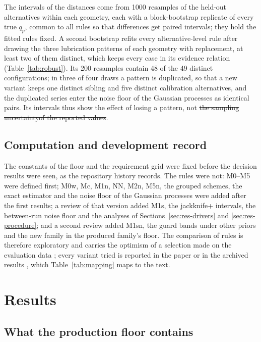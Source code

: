 \documentclass[pdflatex,sn-basic,lineno]{sn-jnl}
\providecommand{\DIFadd}[1]{{\protect\color{blue}\uwave{#1}}} %
\providecommand{\DIFdel}[1]{{\protect\color{red}\sout{#1}}}                      %
\providecommand{\DIFaddbegin}{} %
\providecommand{\DIFaddend}{} %
\providecommand{\DIFdelbegin}{} %
\providecommand{\DIFdelend}{} %
\newcommand{\DIFscaledelfig}{0.5}
\newlength{\DIFdelgraphicswidth} %
\newlength{\DIFdelgraphicsheight} %
\newcommand{\DIFaddincludegraphics}[2][]{{\color{blue}\fbox{\DIFOincludegraphics[#1]{#2}}}} %
\newcommand{\DIFdelincludegraphics}[2][]{%
\sbox{\DIFdelgraphicsbox}{\DIFOincludegraphics[#1]{#2}}%
\settoboxwidth{\DIFdelgraphicswidth}{\DIFdelgraphicsbox} %
\settoboxtotalheight{\DIFdelgraphicsheight}{\DIFdelgraphicsbox} %
\scalebox{\DIFscaledelfig}{%
\parbox[b]{\DIFdelgraphicswidth}{\usebox{\DIFdelgraphicsbox}\\[-\baselineskip] \rule{\DIFdelgraphicswidth}{0em}}\llap{\resizebox{\DIFdelgraphicswidth}{\DIFdelgraphicsheight}{%
\setlength{\unitlength}{\DIFdelgraphicswidth}%
\begin{picture}(1,1)%
\thicklines\linethickness{2pt} %
{\color[rgb]{1,0,0}\put(0,0){\framebox(1,1){}}}%
{\color[rgb]{1,0,0}\put(0,0){\line( 1,1){1}}}%
{\color[rgb]{1,0,0}\put(0,1){\line(1,-1){1}}}%
\end{picture}%
}\hspace*{3pt}}} %
} %
\DeclareRobustCommand{\DIFaddbegin}{\DIFOaddbegin \let\includegraphics\DIFaddincludegraphics} %
\DeclareRobustCommand{\DIFaddend}{\DIFOaddend \let\includegraphics\DIFOincludegraphics} %
\DeclareRobustCommand{\DIFdelbegin}{\DIFOdelbegin \let\includegraphics\DIFdelincludegraphics} %
\DeclareRobustCommand{\DIFdelend}{\DIFOaddend \let\includegraphics\DIFOincludegraphics} %
\begin{document}
The intervals of the distances come from 1000 resamples of the held-out alternatives within each geometry, each with a block-bootstrap replicate of every true $q_p$, common to all rules so that differences get paired intervals; they hold the fitted rules fixed. A second bootstrap refits every alternative-level rule after drawing the three lubrication patterns of each geometry with replacement, at least two of them distinct, which keeps every case in its evidence relation (Table~\ref{tab:robust}). Its 200 resamples contain 48 of the 49 distinct configurations; in three of four draws a pattern is duplicated, so that a new variant keeps one distinct sibling and five distinct calibration alternatives, and the duplicated series enter the noise floor of the Gaussian processes as identical pairs. Its intervals thus show the effect of losing a pattern, not \DIFdelbegin \DIFdel{the sampling uncertaintyof the reported values}\DIFdelend \DIFaddbegin \DIFadd{sampling uncertainty}\DIFaddend .

\subsection{Computation and development record}\label{sec:computation}

The constants of the floor and the requirement grid were fixed before the decision results were seen, as the repository history records. The rules were not: M0--M5 were defined first; M0w, Mc, M1n, NN, M2n, M5n, the grouped schemes, the exact estimator and the noise floor of the Gaussian processes were added after the first results; a review of that version added M1s, the jackknife+ intervals, the between-run noise floor and the analyses of Sections~\ref{sec:res-drivers} and \ref{sec:res-procedure}; and a second review added M1sn, the guard bands under other priors and the new family in the produced family's floor. The comparison of rules is therefore exploratory and carries the optimism of a selection made on the evaluation data \citep{cawley2010over}; every variant tried is reported in the paper or in the archived results \citep{canseven2026archive}, which Table~\ref{tab:mapping} maps to the text.

\section{Results}\label{sec:results}

\subsection{What the production floor contains}\label{sec:res-floor}
\end{document}
